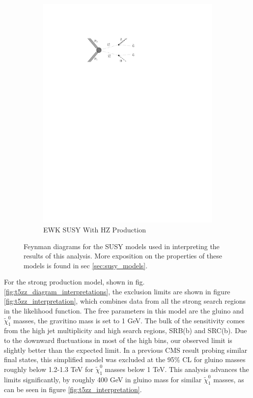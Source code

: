 \begin{figure}[!h]
\begin{subfigure}[b]{0.49\textwidth}
        \includegraphics[width=\textwidth]{figures/diagrams/TChiHZ.pdf}
        \caption{EWK SUSY With HZ Production}
        \label{fig:tchihz_diagram_interpretations}
      \end{subfigure}
      \caption{ \label{fig:SUSY_diagrams_interpretation_sec}
        Feynman diagrams for the SUSY models used in interpreting the results of this analysis. More exposition on the properties of these models is found in sec \ref{sec:susy_models}.}
    \end{figure}

    For the strong production model, shown in fig. \ref{fig:t5zz_diagram_interpretations}, the exclusion limits are shown in figure \ref{fig:t5zz_interpretation}, which combines data from all the strong search regions in the likelihood function. The free parameters in this model are the gluino and $\widetilde{\chi}^0_1$ masses, the gravitino mass is set to 1 GeV. The bulk of the sensitivity comes from the high jet multiplicity and high \MET search regions, SRB(b) and SRC(b). Due to the downward fluctuations in most of the high \MET bins, our observed limit is slightly better than the expected limit. In a previous CMS result probing similar final states,\cite{paper_2015} this simplified model was excluded at the 95\% CL for gluino masses roughly below 1.2-1.3 TeV for $\widetilde{\chi}^0_1$ masses below 1 TeV. This analysis advances the limits significantly, by roughly 400 GeV in gluino mass for similar $\widetilde{\chi}^0_1$ masses, as can be seen in figure \ref{fig:t5zz_interpretation}. 

